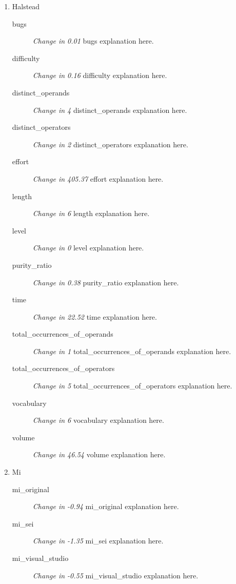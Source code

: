 \begin{enumerate}
      \item Halstead
            \begin{description}
                  \item [bugs] \textit{Change in 0.01} bugs explanation here.
                  \item [difficulty] \textit{Change in 0.16} difficulty explanation here.
                  \item [distinct\_operands] \textit{Change in 4} distinct\_operands explanation here.
                  \item [distinct\_operators] \textit{Change in 2} distinct\_operators explanation here.
                  \item [effort] \textit{Change in 405.37} effort explanation here.
                  \item [length] \textit{Change in 6} length explanation here.
                  \item [level] \textit{Change in 0} level explanation here.
                  \item [purity\_ratio] \textit{Change in 0.38} purity\_ratio explanation here.
                  \item [time] \textit{Change in 22.52} time explanation here.
                  \item [total\_occurrences\_of\_operands] \textit{Change in 1} total\_occurrences\_of\_operands explanation here.
                  \item [total\_occurrences\_of\_operators] \textit{Change in 5} total\_occurrences\_of\_operators explanation here.
                  \item [vocabulary] \textit{Change in 6} vocabulary explanation here.
                  \item [volume] \textit{Change in 46.54} volume explanation here.
            \end{description}
      \item Mi
            \begin{description}
                  \item [mi\_original] \textit{Change in -0.94} mi\_original explanation here.
                  \item [mi\_sei] \textit{Change in -1.35} mi\_sei explanation here.
                  \item [mi\_visual\_studio] \textit{Change in -0.55} mi\_visual\_studio explanation here.
            \end{description}
\end{enumerate}
